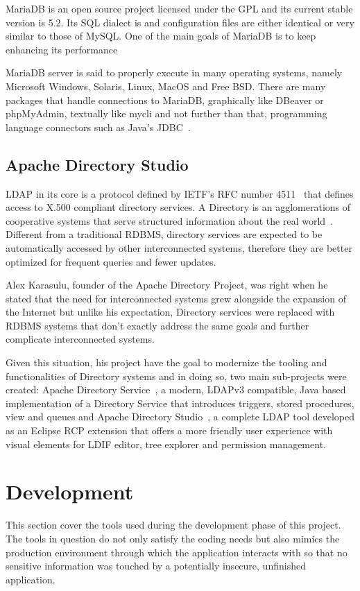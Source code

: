MariaDB is an open source project licensed under the \gls{GPL} and its current stable version is 5.2. Its \gls{SQL} dialect is and configuration files are either identical or very similar to those of MySQL. One of the main goals of MariaDB is to keep enhancing its performance~\cite{BARTHOLOMEW:2012}

MariaDB server is said to properly execute in many operating systems, namely Microsoft Windows, Solaris, Linux, MacOS and Free BSD. There are many packages that handle connections to MariaDB, graphically like DBeaver or phpMyAdmin, textually like mycli and not further than that, programming language connectors such as Java's \gls{JDBC}~\cite{MARIADB:2019}.

\subsection{Apache Directory Studio}\label{ads}
\gls{LDAP} in its core is a protocol defined by \gls{IETF}'s \gls{RFC} number 4511~\cite{ldaprfc} that defines access to X.500 compliant directory services. A Directory is an agglomerations of cooperative systems that serve structured information about the real world~\cite{x500}. Different from a traditional \gls{RDBMS}, directory services are expected to be automatically accessed by other interconnected systems, therefore they are better optimized for frequent queries and fewer updates.

Alex Karasulu, founder of the Apache Directory Project, was right when he stated that the need for interconnected systems grew alongside the expansion of the Internet but unlike his expectation, Directory services were replaced with \gls{RDBMS} systems that don't exactly address the same goals and further complicate interconnected systems\cite{apachedp}.

Given this situation, his project have the goal to modernize the tooling and functionalities of Directory systems and in doing so, two main sub-projects were created: Apache Directory Service~\cite{apachedservice}, a modern, \gls{LDAP}v3 compatible, Java based implementation of a Directory Service that introduces triggers, stored procedures, view and queues and Apache Directory Studio~\cite{apacheds}, a complete \gls{LDAP} tool developed as an Eclipse \gls{RCP} extension that offers a more friendly user experience with visual elements for  \gls{LDIF} editor, tree explorer and permission management.

\section{Development}\label{development}
This section cover the tools used during the development phase of this project. The tools in question do not only satisfy the coding needs but also mimics the production environment through which the application interacts with so that no sensitive information was touched by a potentially insecure, unfinished application.

